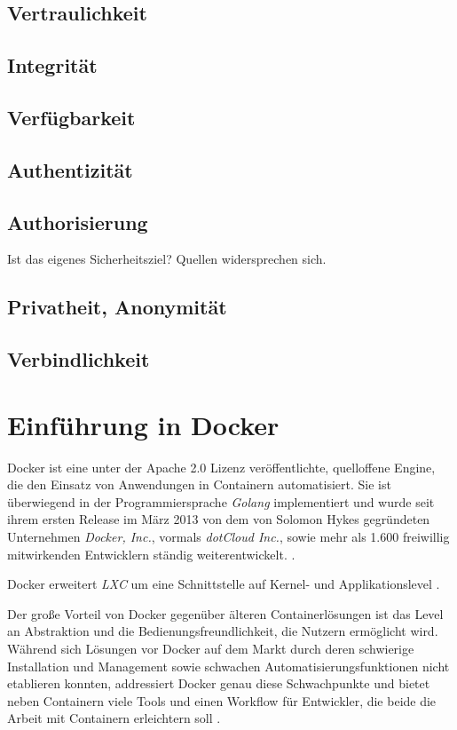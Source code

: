 \documentclass[../main.tex]{subfiles}
\begin{document}
    \subsection{Vertraulichkeit}
    \subsection{Integrität}
    \subsection{Verfügbarkeit}
    \subsection{Authentizität}
    \subsection{Authorisierung}
      Ist das eigenes Sicherheitsziel? Quellen widersprechen sich.
    \subsection{Privatheit, Anonymität}
    \subsection{Verbindlichkeit}
  \section{Einführung in Docker}
  \label{dockerIntro}
    Docker ist eine unter der Apache 2.0 Lizenz veröffentlichte, quelloffene Engine, die den Einsatz von Anwendungen in Containern automatisiert. Sie ist überwiegend in der Programmiersprache \emph{Golang} implementiert und wurde seit ihrem ersten Release im März 2013 von dem von Solomon Hykes gegründeten Unternehmen \emph{Docker, Inc.}\cite{dockerHykes}, vormals \emph{dotCloud Inc.}, sowie mehr als 1.600 freiwillig mitwirkenden Entwicklern ständig weiterentwickelt. \cite{githubDocker}\cite[S.7]{dockerBook}\cite{githubDockerChangelog}\cite{dockerCompany}.

    Docker erweitert \emph{LXC} um eine Schnittstelle auf Kernel- und Applikationslevel \cite[S.2]{dockerLXCKub}.



    Der große Vorteil von Docker gegenüber älteren Containerlösungen ist das Level an Abstraktion und die Bedienungsfreundlichkeit, die Nutzern ermöglicht wird. Während sich Lösungen vor Docker auf dem Markt durch deren schwierige Installation und Management sowie schwachen Automatisierungsfunktionen nicht etablieren konnten, addressiert Docker genau diese Schwachpunkte \cite[S.7]{dockerBook} und bietet neben Containern viele Tools und einen Workflow für Entwickler, die beide die Arbeit mit Containern erleichtern soll \cite[S.1]{dockerIntroIEEE}.
\end{document}
